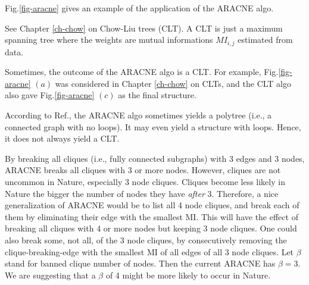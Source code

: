 Fig.\ref{fig-aracne}
gives an example 
of the application
of the ARACNE algo.

See Chapter \ref{ch-chow} on 
Chow-Liu trees (CLT).
A CLT is just
a  maximum spanning tree
where the weights are 
mutual informations 
 $MI_{i,j}$
estimated from data.

Sometimes, the outcome
of the ARACNE algo is a CLT.
For example,
Fig.\ref{fig-aracne}
$(a)$
was considered
in Chapter \ref{ch-chow}
on CLTs, and
the CLT algo
also
gave 
Fig.\ref{fig-aracne}
$(c)$ as the final structure.

According to Ref.\cite{aracne}, the 
 ARACNE algo sometimes 
yields  a polytree (i.e., 
a connected graph with no loops).
It may even  
yield a structure with loops.
Hence, it does not always yield a CLT.

By breaking all cliques (i.e., fully
connected subgraphs)
with 3 edges and 3 nodes, ARACNE 
breaks all cliques with  
3 or more nodes. 
However, cliques are 
not uncommon in Nature,
especially 3 node cliques. 
Cliques become less likely in Nature 
the bigger the number of nodes they have
{\it after} 3.
Therefore, a nice  
generalization of ARACNE
would be to list all 
4 node cliques,
and break each of 
them by eliminating their edge
with the smallest MI.
This will
have the effect of breaking
all cliques with 
4 or more nodes
but keeping 3 node cliques.
One could also break
some, not all, of the 3 node cliques,
by consecutively removing the 
clique-breaking-edge 
with the smallest
MI
of all edges of all 3 node cliques.
Let $\beta$ stand for banned clique number
of nodes.  Then
the current ARACNE has 
$\beta=3$.
We are suggesting that a $\beta$ of
4 might be more likely
to occur in Nature.

